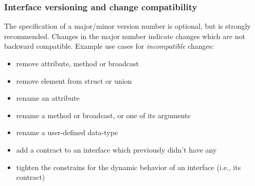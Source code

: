 \documentclass[a4paper,10pt]{scrreprt}
\newlength{\XdocItemIndent}
\begin{document}
\subsubsection{Interface versioning and change compatibility}
\label{FIDL_Interface_Basic_Versioning}
The specification of a major/minor version number is optional, but is strongly recommended.
Changes in the major number indicate changes which are not backward compatible.
Example use cases for \textit{incompatible} changes:
\setlength{\XdocItemIndent}{\textwidth}
\begin{itemize}
\addtolength{\XdocItemIndent}{-2.5em}
\item \begin{minipage}[t]{\XdocItemIndent}
remove attribute, method or broadcast

\end{minipage}
\item \begin{minipage}[t]{\XdocItemIndent}
remove element from struct or union

\end{minipage}
\item \begin{minipage}[t]{\XdocItemIndent}
rename an attribute

\end{minipage}
\item \begin{minipage}[t]{\XdocItemIndent}
rename a method or broadcast, or one of its arguments

\end{minipage}
\item \begin{minipage}[t]{\XdocItemIndent}
rename a user-defined data-type

\end{minipage}
\item \begin{minipage}[t]{\XdocItemIndent}
add a contract to an interface which previously didn't have any

\end{minipage}
\item \begin{minipage}[t]{\XdocItemIndent}
tighten the constrains for the dynamic behavior of an interface (i.e., its contract)

\end{minipage}
\end{itemize}
\addtolength{\XdocItemIndent}{2.5em}
\end{document}
